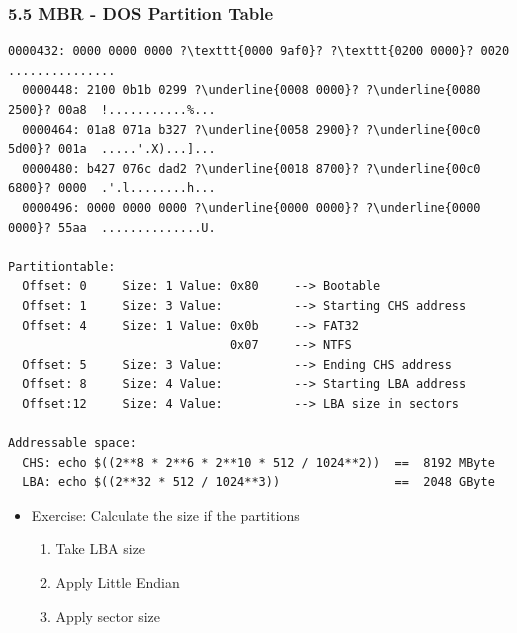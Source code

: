 \begin{frame}[fragile]
  \frametitle{5.5 MBR - DOS Partition Table}
  \begin{lstlisting}[basicstyle=\tiny,escapechar=\?]
  0000432: 0000 0000 0000 ?\texttt{0000 9af0}? ?\texttt{0200 0000}? 0020  ............... 
  0000448: 2100 0b1b 0299 ?\underline{0008 0000}? ?\underline{0080 2500}? 00a8  !...........%...
  0000464: 01a8 071a b327 ?\underline{0058 2900}? ?\underline{00c0 5d00}? 001a  .....'.X)...]...
  0000480: b427 076c dad2 ?\underline{0018 8700}? ?\underline{00c0 6800}? 0000  .'.l........h...
  0000496: 0000 0000 0000 ?\underline{0000 0000}? ?\underline{0000 0000}? 55aa  ..............U.

Partitiontable:
  Offset: 0     Size: 1	Value: 0x80     --> Bootable
  Offset: 1     Size: 3	Value:          --> Starting CHS address
  Offset: 4     Size: 1	Value: 0x0b     --> FAT32
                               0x07     --> NTFS
  Offset: 5     Size: 3	Value:          --> Ending CHS address
  Offset: 8     Size: 4 Value:          --> Starting LBA address
  Offset:12     Size: 4 Value:          --> LBA size in sectors
  
Addressable space:
  CHS: echo $((2**8 * 2**6 * 2**10 * 512 / 1024**2))  ==  8192 MByte
  LBA: echo $((2**32 * 512 / 1024**3))                ==  2048 GByte
  \end{lstlisting}
    \begin{itemize}
        \item Exercise: Calculate the size if the partitions
        \begin{enumerate}
            \item Take LBA size
	    \item Apply Little Endian
	    \item Apply sector size
        \end{enumerate}
    \end{itemize}
\end{frame}


